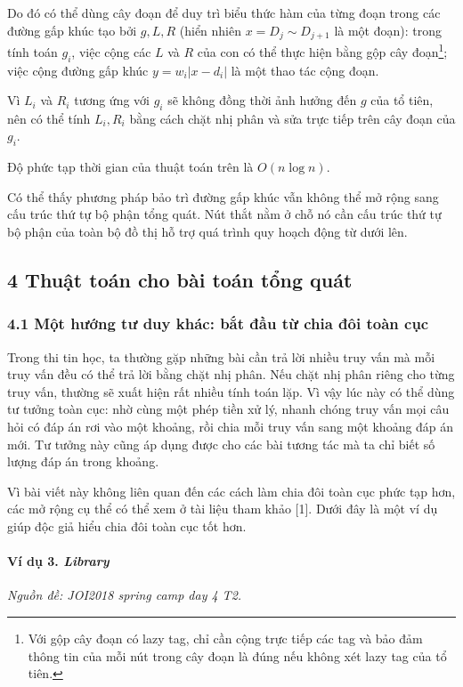 \documentclass[11pt]{article}
\begin{document}
Do đó có thể dùng cây đoạn để duy trì biểu thức hàm của từng đoạn trong các
đường gấp khúc tạo bởi \(g,L,R\) (hiển nhiên \(x=D_j\sim D_{j+1}\) là một đoạn):
trong tính toán \(g_i\), việc cộng các \(L\) và \(R\) của con có thể thực hiện
bằng gộp cây đoạn\footnote{Với gộp cây đoạn có lazy tag, chỉ cần cộng trực tiếp
các tag và bảo đảm thông tin của mỗi nút trong cây đoạn là đúng nếu không xét
lazy tag của tổ tiên.}; việc cộng đường gấp khúc \(y=w_i|x-d_i|\) là một thao
tác cộng đoạn.

Vì \(L_i\) và \(R_i\) tương ứng với \(g_i\) sẽ không đồng thời ảnh hưởng đến
\(g\) của tổ tiên, nên có thể tính \(L_i,R_i\) bằng cách chặt nhị phân và sửa
trực tiếp trên cây đoạn của \(g_i\).

Độ phức tạp thời gian của thuật toán trên là \(O(n\log n)\).

Có thể thấy phương pháp bảo trì đường gấp khúc vẫn không thể mở rộng sang cấu
trúc thứ tự bộ phận tổng quát. Nút thắt nằm ở chỗ nó cần cấu trúc thứ tự bộ
phận của toàn bộ đồ thị hỗ trợ quá trình quy hoạch động từ dưới lên.

\subsection*{4 Thuật toán cho bài toán tổng quát}

\subsubsection*{4.1 Một hướng tư duy khác: bắt đầu từ chia đôi toàn cục}

Trong thi tin học, ta thường gặp những bài cần trả lời nhiều truy vấn mà mỗi
truy vấn đều có thể trả lời bằng chặt nhị phân. Nếu chặt nhị phân riêng cho
từng truy vấn, thường sẽ xuất hiện rất nhiều tính toán lặp. Vì vậy lúc này có
thể dùng tư tưởng toàn cục: nhờ cùng một phép tiền xử lý, nhanh chóng truy vấn
mọi câu hỏi có đáp án rơi vào một khoảng, rồi chia mỗi truy vấn sang một khoảng
đáp án mới. Tư tưởng này cũng áp dụng được cho các bài tương tác mà ta chỉ biết
số lượng đáp án trong khoảng.

Vì bài viết này không liên quan đến các cách làm chia đôi toàn cục phức tạp
hơn, các mở rộng cụ thể có thể xem ở tài liệu tham khảo [1]. Dưới đây là một ví
dụ giúp độc giả hiểu chia đôi toàn cục tốt hơn.

\paragraph{Ví dụ 3. \emph{Library}}
\noindent\emph{Nguồn đề: JOI2018 spring camp day 4 T2.}
\end{document}

